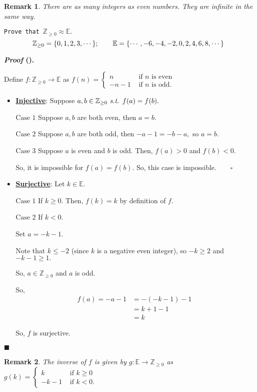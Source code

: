 \documentclass[12pt,a4paper]{article}
\newcounter{nprf}[subsection]
\newtheorem*{rmk}{\indent Remark}
\newenvironment*{prf}{\par\indent\textbf{\textit{Proof} (\stepcounter{nprf}\thenprf). }\par }{\par\hfill $\blacksquare$\par}
\def\Z{{\mathbb{Z}}}
\def\E{{\mathbb{E}}}
\def\st{\emph{ s.t. }}
\begin{document}
\begin{rmk}
There are as many integers as even numbers. They are infinite in the same way.	
\end{rmk}
\begin{framed}
\noindent\texttt{Prove that $\Z_{\geq0}\approx\E.$}	
\[\Z_{\geq0}=\qty{0,1,2,3,\cdots};\qquad\E=\qty{\cdots,-6,-4,-2,0,2,4,6,8,\cdots}\]
\begin{prf}\label{prf6.1.4}
	Define $f:\Z_{\geq0}\to\E$ as $f(n)=\begin{cases}n &\text{ if }n\text{ is even}\\-n-1&\text{ if }n\text{ is odd}.\end{cases}$\begin{itemize}
		\item \textbf{\underline{Injective}}: Suppose $a,b\in\Z_{\geq0}\st f(a)=f(b).$\par $\boxed{\text{Case }1}$ Suppose $a,b$ are both even, then $a=b.$\par $\boxed{\text{Case }2}$ Suppose $a,b$ are both odd, then $-a-1=-b-a,$ so $a=b$.\par $\boxed{\text{Case 3}}$ Suppose $a$ is even and $b$ is odd. Then, $f(a)>0$ and $f(b)<0.$\par\hspace{5mm} So, it is impossible for $f(a)=f(b).$ So, this case is impossible.$\qquad\square$
		\item \textbf{\underline{Surjective}}: Let $k\in\E.$\par $\boxed{\text{Case }1}$ If $k\geq0.$ Then, $f(k)=k$ by definition of $f$.\par $\boxed{\text{Case }2}$ If $k<0.$\par\hspace{5mm} Set $a=-k-1.$\par\hspace{5mm} Note that $k\leq-2$ (since $k$ is a negative even integer), so $-k\geq2$ and $-k-1\geq1.$\par\hspace{5mm} So, $a\in\Z_{\geq0}$ and $a$ is odd.\par\hspace{5mm} So, \[\begin{aligned}f(a)=-a-1&=-(-k-1)-1\\&=k+1-1\\&=k\end{aligned}\]\par\hspace{5mm} So, $f$ is surjective.
	\end{itemize}
\end{prf}
\begin{rmk}The inverse of $f$ is given by $g:\E\to\Z_{\geq0}$ as $g(k)=\begin{cases}k&\text{ if }k\geq0\\-k-1&\text{ if }k<0.\end{cases}$\end{rmk}
\end{framed}
\end{document}
